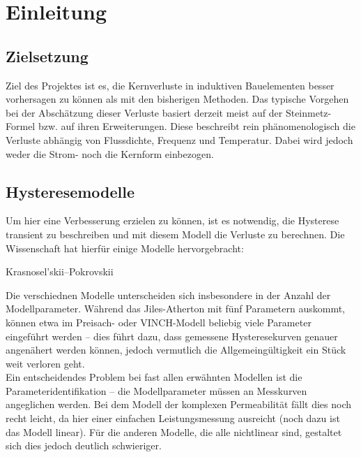 \documentclass{scrartcl}
\begin{document}
\tableofcontents
\newpage
\section{Einleitung}
\subsection{Zielsetzung}
Ziel des Projektes ist es, die Kernverluste in induktiven Bauelementen besser vorhersagen zu können als mit den bisherigen Methoden. Das typische Vorgehen bei der Abschätzung dieser Verluste basiert derzeit meist auf der Steinmetz-Formel bzw. auf ihren Erweiterungen. Diese beschreibt rein phänomenologisch die Verluste abhängig von Flussdichte, Frequenz und Temperatur. Dabei wird jedoch weder die Strom- noch die Kernform einbezogen.\\
\subsection{Hysteresemodelle}
Um hier eine Verbesserung erzielen zu können, ist es notwendig, die Hysterese transient zu beschreiben und mit diesem Modell die Verluste zu berechnen. Die Wissenschaft hat hierfür einige Modelle hervorgebracht:
\begin{labeling}{Krasnosel’skii–Pokrovskii}
	\item[Komplexe Permeabilität]{}
	\item[Jiles-Atherton]{}
	\item[Preisach]{}
	\item[Coleman-Hodgdon]{}
	\item[Krasnosel’skii–Pokrovskii]{}
	\item[Maxwell-Slip]{}
	\item[Bouc–Wen]{}
	\item[Duhem]{}
	\item[VINCH]{}
\end{labeling}
Die verschiednen Modelle unterscheiden sich insbesondere in der Anzahl der Modellparameter. Während das Jiles-Atherton mit fünf Parametern auskommt, können etwa im Preisach- oder VINCH-Modell beliebig viele Parameter eingeführt werden -- dies führt dazu, dass gemessene Hysteresekurven genauer angenähert werden können, jedoch vermutlich die Allgemeingültigkeit ein Stück weit verloren geht.\\
Ein entscheidendes Problem bei fast allen erwähnten Modellen ist die Parameteridentifikation -- die Modellparameter müssen an Messkurven angeglichen werden. Bei dem Modell der komplexen Permeabilität fällt dies noch recht leicht, da hier einer einfachen Leistungsmessung ausreicht (noch dazu ist das Modell linear). Für die anderen Modelle, die alle nichtlinear sind, gestaltet sich dies jedoch deutlich schwieriger.
\end{document}
